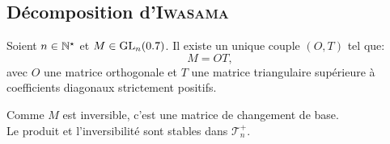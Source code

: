 \subsection{Décomposition d'\textsc{Iwasama}}
\begin{theo}{}
    Soient $n \in \mathbb{N}^\star$ et $M \in \mathrm{GL}_n(0.7)$. Il existe un unique couple $(O, T)$ tel que:
    $$M = OT,$$
    avec $O$ une matrice orthogonale et $T$ une matrice triangulaire supérieure à coefficients diagonaux strictement positifs.
\end{theo}
Comme $M$ est inversible, c'est une matrice de changement de base. \\
Le produit et l'inversibilité sont stables dans $\mathscr{T}_n^+$.
